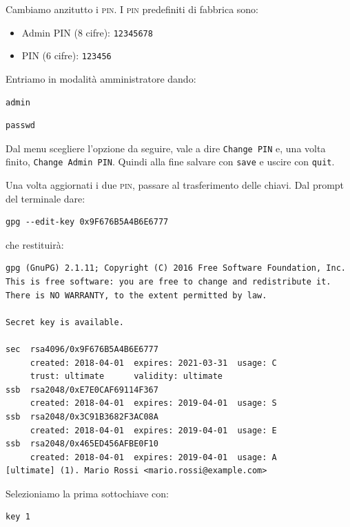 \documentclass[a4paper,10pt]{article}
\begin{document}
Cambiamo anzitutto i \textsc{pin}. I \textsc{pin} predefiniti di fabbrica sono:

\begin{itemize}
   \item Admin PIN (8 cifre): \texttt{12345678}
   \item PIN (6 cifre): \texttt{123456}
\end{itemize}

Entriamo in modalità amministratore dando:

\begin{lstlisting}
admin
\end{lstlisting}

\begin{lstlisting}
passwd
\end{lstlisting}

Dal menu scegliere l'opzione da seguire, vale a dire \texttt{Change PIN} e, una volta finito, \texttt{Change Admin PIN}. Quindi alla fine salvare con \texttt{save} e uscire con \texttt{quit}.

Una volta aggiornati i due \textsc{pin}, passare al trasferimento delle chiavi. Dal prompt del terminale dare:

\begin{lstlisting}
gpg --edit-key 0x9F676B5A4B6E6777
\end{lstlisting}

che restituirà:

\begin{lstlisting}
gpg (GnuPG) 2.1.11; Copyright (C) 2016 Free Software Foundation, Inc.
This is free software: you are free to change and redistribute it.
There is NO WARRANTY, to the extent permitted by law.

Secret key is available.

sec  rsa4096/0x9F676B5A4B6E6777
     created: 2018-04-01  expires: 2021-03-31  usage: C
     trust: ultimate      validity: ultimate
ssb  rsa2048/0xE7E0CAF69114F367
     created: 2018-04-01  expires: 2019-04-01  usage: S
ssb  rsa2048/0x3C91B3682F3AC08A
     created: 2018-04-01  expires: 2019-04-01  usage: E
ssb  rsa2048/0x465ED456AFBE0F10
     created: 2018-04-01  expires: 2019-04-01  usage: A
[ultimate] (1). Mario Rossi <mario.rossi@example.com>
\end{lstlisting}

Selezioniamo la prima sottochiave con:

\begin{lstlisting}
key 1
\end{lstlisting}
\end{document}
